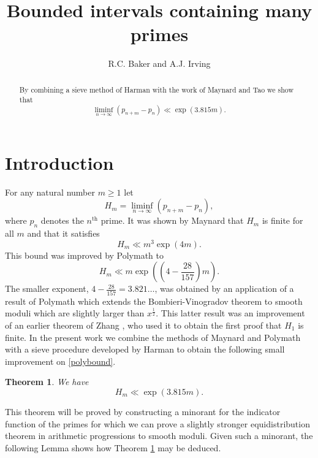 \documentclass[12pt]{amsart}
\theoremstyle{plain}
\newtheorem{thm}{Theorem}[section]
\theoremstyle{definition}
\numberwithin{equation}{section}
\begin{document}
\title{Bounded intervals containing many primes}
\author{R.C. Baker and A.J. Irving}

\maketitle

\begin{abstract}
By combining a sieve method of Harman with the work of Maynard and Tao we show that 
$$\liminf_{n\rightarrow \infty}(p_{n+m}-p_n)\ll \exp(3.815m).$$
\end{abstract}

\section{Introduction}

For any natural number $m\geq 1$ let
$$H_m=\liminf_{n\rightarrow \infty}(p_{n+m}-p_n),$$ 
where $p_n$ denotes the $n^{\mathrm{th}}$ prime.  It was shown by Maynard \cite{maynardsmall} that $H_m$ is finite for all $m$ and that it satisfies 
$$H_m\ll m^3 \exp(4m).$$
This bound was improved by Polymath \cite[Theorem 1.4(vi)]{polymath8b} to 
\begin{equation}\label{polybound}
H_m\ll m\exp\left(\left(4-\frac{28}{157}\right)m\right).
\end{equation}
The smaller exponent, $4-\frac{28}{157}=3.821\ldots$, was obtained by an application of a result of Polymath \cite{polymath8a} which extends the Bombieri-Vinogradov theorem to smooth moduli which are slightly larger than $x^{\frac12}$.  This latter result was an improvement of an earlier theorem of Zhang \cite{zhang}, who used it to obtain the first proof that $H_1$ is finite.  In the present work we combine the methods of Maynard and Polymath with a sieve procedure developed by Harman \cite{har83, har96, harmanbook} to obtain the following small improvement on \eqref{polybound}.

\begin{thm}\label{mainthm}
We have 
$$H_m\ll \exp(3.815m).$$
\end{thm}

This theorem will be proved by constructing a minorant for the indicator function of the primes for which we can prove a slightly stronger equidistribution theorem in arithmetic progressions to smooth moduli.  Given such a minorant, the following Lemma shows how Theorem \ref{mainthm} may be deduced.
\end{document}
